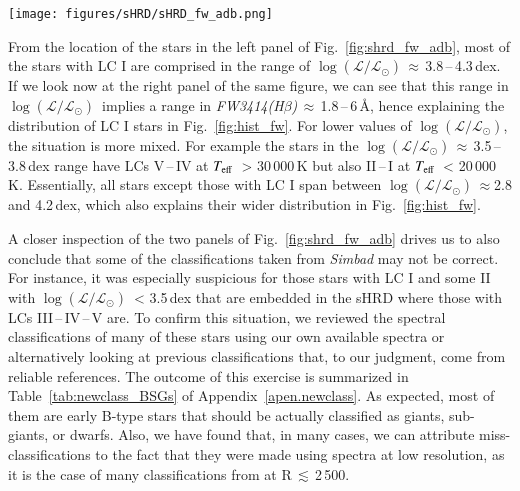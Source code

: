 \documentclass{aa}
\newcommand{\kms}{\mbox{km\,s$^{-1}$}}
\newcommand{\vsini}{\mbox{$v\sin i$}}
\newcommand{\Teff}{\mbox{$T_{\rm eff}$}}
\newcommand{\logLs}{$\log (\mathcal{L}/\mathcal{L}_{\odot})$}
\newcommand{\ls}{\mbox{$\lesssim$}}
\newcommand{\fwhb}{\textit{FW3414(H$\beta$)}}
\begin{document}
\begin{figure*}[!t]
\centering
\texttt{[image: figures/sHRD/sHRD\_fw\_adb.png]}
\caption{Preliminary results from the quantitative spectroscopic analysis of $\sim$500 O9\,--\,B6 type stars presented in this work for which the \fwhb\ has been measured. The color-code in both panels indicates the LC taken from \textit{Simbad}. Left panel: sHRD for these stars and additional results from \citet{2018A&A...613A..65Hol}, indicated with gray dots. The evolutionary tracks are taken from the MESA Isochrones \& Stellar Tracks online tool for solar metallicity and no initial rotation. The approximate separation between the O-type stars and the B-type stars is indicated with a black dotted diagonal line. The black dashed horizontal line at \logLs\ = 3.5\,dex used in the selection of the working sample is indicated (also shown in the right panel). Right panel: \logLs\ against \fwhb\ for the same $\sim$500 stars. The vertical red dashed line shows the adopted value to select the working sample. Open circles indicate stars with \vsini\ > 120\,\kms, and gray crosses are SB2+ systems.}
\label{fig:shrd_fw_adb}
\end{figure*}

From the location of the stars in the left panel of Fig.~\ref{fig:shrd_fw_adb}, most of the stars with LC I are comprised in the range of \logLs\,$\approx$\,3.8\,--\,4.3\,dex. If we look now at the right panel of the same figure, we can see that this range in \logLs\ implies a range in \fwhb\,$\approx$\,1.8\,--\,6\,\AA, hence explaining the distribution of LC I stars in Fig.~\ref{fig:hist_fw}. For lower values of \logLs, the situation is more mixed. For example the stars in the \logLs\,$\approx$\,3.5\,--\,3.8\,dex range have LCs V\,--\,IV at \Teff\ > 30\,000\,K but also II\,--\,I at \Teff\ < 20\,000\,K. Essentially, all stars except those with LC I span between \logLs\,$\approx$2.8 and 4.2\,dex, which also explains their wider distribution in Fig.~\ref{fig:hist_fw}.

A closer inspection of the two panels of Fig.~\ref{fig:shrd_fw_adb} drives us to also conclude that some of the classifications taken from \textit{Simbad} may not be correct. For instance, it was especially suspicious for those stars with LC I and some II with \logLs\ < 3.5\,dex that are embedded in the sHRD where those with LCs III\,--\,IV\,--\,V are. To confirm this situation, we reviewed the spectral classifications of many of these stars using our own available spectra or alternatively looking at previous classifications that, to our judgment, come from reliable references. The outcome of this exercise is summarized in Table~\ref{tab:newclass_BSGs} of Appendix~\ref{apen.newclass}. As expected, most of them are early B-type stars that should be actually classified as giants, sub-giants, or dwarfs. Also, we have found that, in many cases, we can attribute miss-classifications to the fact that they were made using spectra at low resolution, as it is the case of many classifications from \citet{1999mctd.book.....H} at R\,\ls\,2\,500.
\end{document}
